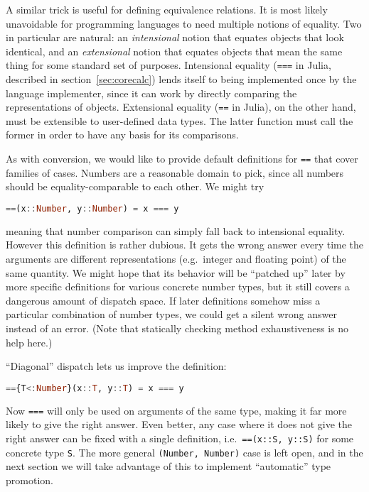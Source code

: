A similar trick is useful for defining equivalence relations.
It is most likely unavoidable for programming languages to need multiple
notions of equality.
Two in particular are natural: an \emph{intensional}
notion that equates objects that look identical, and an \emph{extensional}
notion that equates objects that mean the same thing for some standard
set of purposes.
Intensional equality (\texttt{===} in Julia, described
in section~\ref{sec:corecalc}) lends itself to being implemented once
by the language implementer, since it can work by directly comparing
the representations of objects.
Extensional equality (\texttt{==} in Julia), on the other hand, must be
extensible to user-defined data types.
The latter function must call the former in order to have any basis for
its comparisons.

As with conversion, we would like to provide default definitions for
\texttt{==} that cover families of cases.
Numbers are a reasonable domain to pick, since all numbers should be
equality-comparable to each other.
We might try

\begin{singlespace}
\begin{lstlisting}[language=julia]
==(x::Number, y::Number) = x === y
\end{lstlisting}
\end{singlespace}

\noindent
meaning that number comparison can simply fall back to intensional
equality.
However this definition is rather dubious.
It gets the wrong answer every time the arguments are different representations
(e.g.\ integer and floating point) of the same quantity.
We might hope that its behavior will be ``patched up'' later by more specific
definitions for various concrete number types, but it still covers a dangerous
amount of dispatch space.
If later definitions somehow miss a particular combination of number types,
we could get a silent wrong answer instead of an error.
(Note that statically checking method exhaustiveness is no help here.)

``Diagonal'' dispatch lets us improve the definition:

\begin{singlespace}
\begin{lstlisting}[language=julia]
=={T<:Number}(x::T, y::T) = x === y
\end{lstlisting}
\end{singlespace}

\noindent
Now \texttt{===} will only be used on arguments of the same type,
making it far more likely to give the right answer.
Even better, any case where it does not give the right answer can be fixed with
a single definition, i.e.\ \texttt{==(x::S, y::S)} for some
concrete type \texttt{S}.
The more general \texttt{(Number, Number)} case is left open, and in the next
section we will take advantage of this to implement ``automatic'' type promotion.


